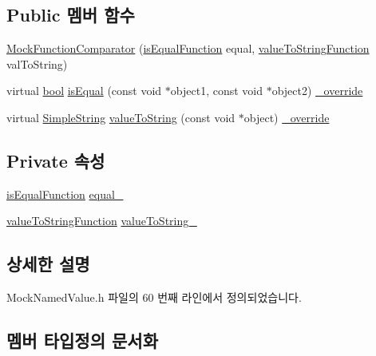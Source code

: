 \subsection*{Public 멤버 함수}
\begin{DoxyCompactItemize}
\item 
\hyperlink{class_mock_function_comparator_a0e8c72a9b6025708ab5e4126b7c540a2}{Mock\+Function\+Comparator} (\hyperlink{class_mock_function_comparator_a992fcad14d02c8565ff25c091499fce8}{is\+Equal\+Function} equal, \hyperlink{class_mock_function_comparator_ae46da1e1cc5f591e2fefb68361dbe33e}{value\+To\+String\+Function} val\+To\+String)
\item 
virtual \hyperlink{avb__gptp_8h_af6a258d8f3ee5206d682d799316314b1}{bool} \hyperlink{class_mock_function_comparator_a43937ecaa593cc2c35079e5a2347bea9}{is\+Equal} (const void $\ast$object1, const void $\ast$object2) \hyperlink{_cpp_u_test_config_8h_a049bea15dd750e15869863c94c1efc3b}{\+\_\+override}
\item 
virtual \hyperlink{class_simple_string}{Simple\+String} \hyperlink{class_mock_function_comparator_ac235f39dbc7ebfe1ab569482258dd450}{value\+To\+String} (const void $\ast$object) \hyperlink{_cpp_u_test_config_8h_a049bea15dd750e15869863c94c1efc3b}{\+\_\+override}
\end{DoxyCompactItemize}
\subsection*{Private 속성}
\begin{DoxyCompactItemize}
\item 
\hyperlink{class_mock_function_comparator_a992fcad14d02c8565ff25c091499fce8}{is\+Equal\+Function} \hyperlink{class_mock_function_comparator_a48230b1ffa10a0dce23d818271280db7}{equal\+\_\+}
\item 
\hyperlink{class_mock_function_comparator_ae46da1e1cc5f591e2fefb68361dbe33e}{value\+To\+String\+Function} \hyperlink{class_mock_function_comparator_a940ae12554fd71daa4feffe21fbbddbf}{value\+To\+String\+\_\+}
\end{DoxyCompactItemize}


\subsection{상세한 설명}


Mock\+Named\+Value.\+h 파일의 60 번째 라인에서 정의되었습니다.



\subsection{멤버 타입정의 문서화}
